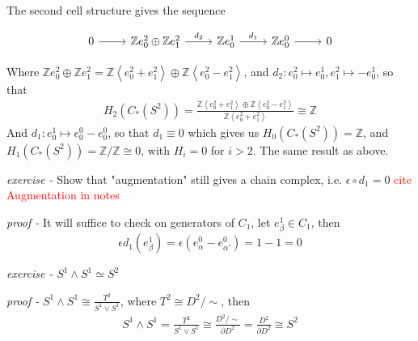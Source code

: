 \documentclass[11pt]{article}
\theoremstyle{definition}
\newcommand{\gen}[1]{\left\langle #1 \right\rangle}
\begin{document}
    The second cell structure gives the sequence

    \begin{equation*}
        \begin{tikzcd}
            0 \arrow[r] & \mathbb{Z}e_0^2 \oplus \mathbb{Z}e_1^2 \arrow[r,"{d_2}"] & \mathbb{Z}e_0^1 \arrow[r,"{d_1}"] & \mathbb{Z}e_0^0 \arrow[r] & 0
        \end{tikzcd}
    \end{equation*}

    Where \(\mathbb{Z}e_0^2 \oplus \mathbb{Z}e_1^2 = \mathbb{Z}\gen{e_0^2 + e_1^2} \oplus \mathbb{Z}\gen{e_0^2 - e_1^2}\), and \(d_2: e_0^2 \mapsto e_0^1, e_1^2 \mapsto -e_0^1\), so that
    \begin{align*}
        H_2(C_*(S^2)) = \frac{\mathbb{Z}\gen{e_0^2 + e_1^2} \oplus \mathbb{Z}\gen{e_0^2 - e_1^2}}{\mathbb{Z}\gen{e_0^2 + e_1^2}} \cong \mathbb{Z}
    \end{align*}
    And \(d_1: e_0^1 \mapsto e_0^0 - e_0^0\), so that \(d_1 \equiv 0\) which gives us \(H_0(C_*(S^2)) = \mathbb{Z}\), and \(H_1(C_*(S^2)) = \mathbb{Z}/\mathbb{Z} \cong 0\), with \(H_i = 0\) for \(i > 2\). The same result as above.
    




    \emph{exercise - }\label{HEx6} Show that "augmentation" still gives a chain complex, i.e. \(\epsilon\circ d_1 = 0\) \textcolor{red}{cite Augmentation in notes}

    \emph{proof - } It will suffice to check on generators of \(C_1\), let \(e^1_\beta \in C_1\), then 
    \[\epsilon d_1(e^1_\beta) = \epsilon (e_\alpha^0 - e_{\alpha'}^0) = 1-1 = 0\]


    \emph{exercise - }\label{HEx7} \(S^1 \wedge S^1 \simeq S^2\)

    \emph{proof - } \(S^1 \wedge S^1 \cong \frac{T^2}{S^1 \vee S^1}\), where \(T^2 \cong D^2/\sim\), then
    \begin{align*}
        S^1 \wedge S^1 = \frac{T^2}{S^1 \vee S^1} \cong \frac{D^2/\sim}{\partial D^2} = \frac{D^2}{\partial D^2} \cong S^2
    \end{align*}

\end{document}

